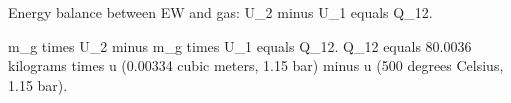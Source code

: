 Energy balance between EW and gas:  
U_2 minus U_1 equals Q_12.  

m_g times U_2 minus m_g times U_1 equals Q_12.  
Q_12 equals 80.0036 kilograms times u (0.00334 cubic meters, 1.15 bar) minus u (500 degrees Celsius, 1.15 bar).